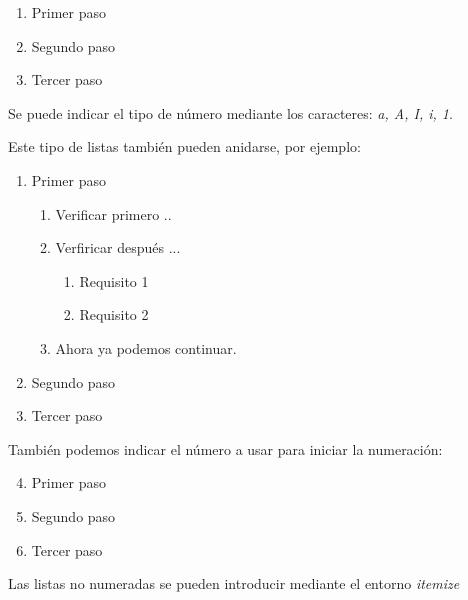 \documentclass[letterpaper,12pt]{report}
\begin{document}

\bigskip

\begin{enumerate}[a]
	\item Primer paso
	\item Segundo paso
	\item Tercer paso
\end{enumerate}

Se puede indicar el tipo de número mediante los caracteres: \textit{a, A, I, i, 1}.

Este tipo de listas también pueden anidarse, por ejemplo:

\begin{enumerate}
	\item Primer paso
		\begin{enumerate}
			\item Verificar primero ..
			\item Verfiricar después ...
				\begin{enumerate}
					\item Requisito 1
					\item Requisito 2
				\end{enumerate}
			\item Ahora ya podemos continuar.
		\end{enumerate}
	\item Segundo paso
	\item Tercer paso
\end{enumerate}

También podemos indicar el número a usar para iniciar la numeración:

\begin{enumerate}
	\setcounter{enumi}{3}
	\item Primer paso
	\item Segundo paso
	\item Tercer paso
\end{enumerate}


Las listas no numeradas se pueden introducir mediante el entorno \textit{itemize} 
\end{document}
